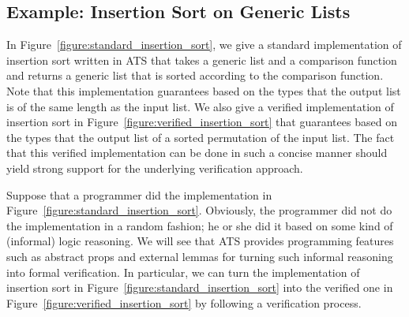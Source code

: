 \documentclass{llncs}
\begin{document}
\subsection{Example: Insertion Sort on Generic Lists}
In Figure~\ref{figure:standard_insertion_sort}, we give a standard
implementation of insertion sort written in ATS that takes a generic list
and a comparison function and returns a generic list that is sorted
according to the comparison function.  Note that this implementation
guarantees based on the types that the output list is of the same length as
the input list. We also give a verified implementation of insertion sort in
Figure~\ref{figure:verified_insertion_sort} that guarantees based on the
types that the output list of a sorted permutation of the input list. The
fact that this verified implementation can be done in such a concise manner
should yield strong support for the underlying verification approach.

Suppose that a programmer did the implementation in
Figure~\ref{figure:standard_insertion_sort}.  Obviously, the programmer did
not do the implementation in a random fashion; he or she did it based on
some kind of (informal) logic reasoning. We will see that ATS provides
programming features such as abstract props and external lemmas for turning
such informal reasoning into formal verification.  In particular, we can turn
the implementation of insertion sort in
Figure~\ref{figure:standard_insertion_sort} into the verified one in
Figure~\ref{figure:verified_insertion_sort} by following a verification
process.

\def\tE{{\bf E}}
\def\tglist{{\bf glist}}
\def\tlte{{\bf lte}}
\def\pORD{{\bf ORD}}
\def\pPERM{{\bf PERM}}
\def\pSORT{{\bf SORT}}
\end{document}
